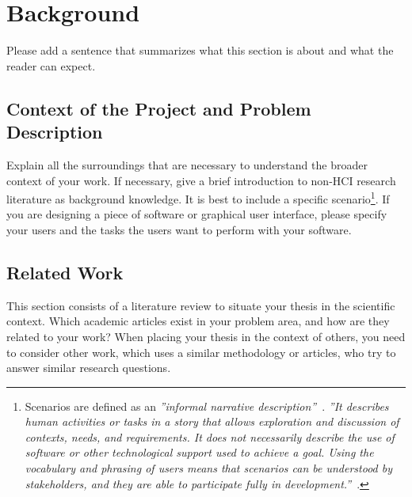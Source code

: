 \section{Background}
\label{sec:background}
Please add a sentence that summarizes what this section is about and what the reader can expect.
\subsection{Context of the Project and Problem Description} 
\label{sec:context}
Explain all the surroundings that are necessary to understand the broader context of your work. If necessary, give a brief introduction to non-HCI research literature as background knowledge. It is best to include a specific scenario\footnote{Scenarios are defined as an \emph{''informal narrative description''}~\cite{carrol1999five}. \emph{''It describes human activities or tasks in a story that allows exploration and discussion of contexts, needs, and requirements. It does not necessarily describe the use of software or other technological support used to achieve a goal. Using the vocabulary and phrasing of users means that scenarios can be understood by stakeholders, and they are able to participate fully in development.''}~\cite{preeceInteractionDesignHumancomputer2015}.}. If you are designing a piece of software or graphical user interface, please specify your users and the tasks the users want to perform with your software.

\subsection{Related Work}
\label{sec:relatedwork}
This section consists of a literature review to situate your thesis in the scientific context. Which academic articles exist in your problem area, and how are they related to your work? When placing your thesis in the context of others, you need to consider other work, which uses a similar methodology or articles, who try to answer similar research questions.

